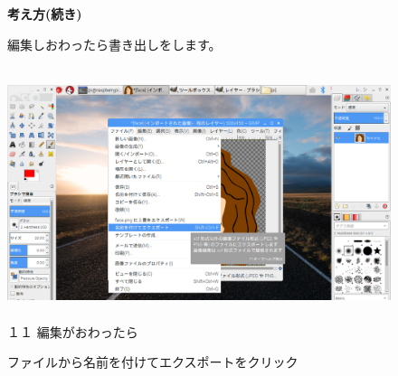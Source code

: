 \documentclass[a4paper,12pt]{jarticle}
\begin{document}
\vfill
\clearpage
\begin{figure}
	\textbf{考え方(続き)}


編集しおわったら書き出しをします。

\centering
\begin{minipage}{13.237cm}
\includegraphics[width=13.178cm,height=7.408cm]{textbook-img138.png}\\
１１ 編集がおわったら

ファイルから名前を付けてエクスポートをクリック
\end{minipage}

\bigskip



\end{figure}
\end{document}
